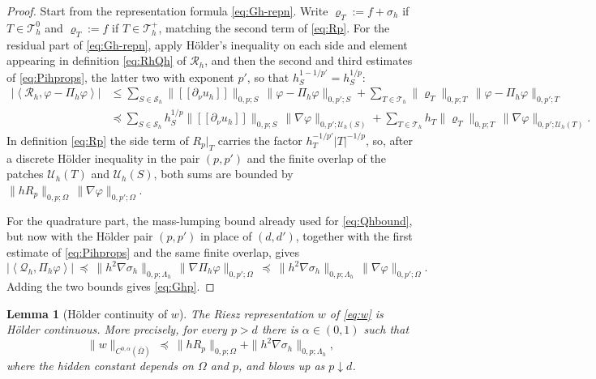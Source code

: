 \documentclass[12pt]{amsart}
\newtheorem{lemma}{Lemma}
\theoremstyle{definition}
\newcommand{\Om}{\Omega}
\newcommand{\Th}{\mathcal{T}_h}
\newcommand{\Sh}{\mathcal{S}_h}
\newcommand{\Pih}{\Pi_h}
\newcommand{\Uh}{\mathcal{U}_h}
\newcommand{\Thplus}{\Th^+}
\newcommand{\Thzero}{\Th^0}
\newcommand{\Rh}{\mathcal{R}_h}
\newcommand{\Qh}{\mathcal{Q}_h}
\newcommand{\jump}[1]{[\![#1]\!]}
\newcommand{\Lamh}{\Lambda_h}
\begin{document}
\begin{proof}
Start from the representation formula \eqref{eq:Gh-repn}.  Write $\varrho_T := f + \sigma_h$ if $T\in\Thzero$ and $\varrho_T := f$ if $T\in\Thplus$, matching the second term of \eqref{eq:Rp}.  For the residual part of \eqref{eq:Gh-repn}, apply H\"older's inequality on each side and element appearing in definition \eqref{eq:RhQh} of $\Rh$, and then the second and third estimates of \eqref{eq:Pihprops}, the latter two with exponent $p'$, so that $h_S^{1-1/p'} = h_S^{1/p}$:
\begin{align*}
  \bigl|\left<\Rh,\varphi-\Pih\varphi\right>\bigr|
  &\le \sum_{S\in\Sh} \bigl\|\jump{\partial_\nu u_h}\bigr\|_{0,p;S}\,\|\varphi-\Pih\varphi\|_{0,p';S}
     + \sum_{T\in\Th} \|\varrho_T\|_{0,p;T}\,\|\varphi-\Pih\varphi\|_{0,p';T} \\
  &\preceq \sum_{S\in\Sh} h_S^{1/p}\bigl\|\jump{\partial_\nu u_h}\bigr\|_{0,p;S}\,\|\nabla\varphi\|_{0,p';\Uh(S)}
     + \sum_{T\in\Th} h_T\|\varrho_T\|_{0,p;T}\,\|\nabla\varphi\|_{0,p';\Uh(T)}.
\end{align*}
In definition \eqref{eq:Rp} the side term of $R_p|_T$ carries the factor $h_T^{-1/p'}|T|^{-1/p}$, so, after a discrete H\"older inequality in the pair $(p,p')$ and the finite overlap of the patches $\Uh(T)$ and $\Uh(S)$, both sums are bounded by $\|hR_p\|_{0,p;\Om}\,\|\nabla\varphi\|_{0,p';\Om}$.

For the quadrature part, the mass-lumping bound already used for \eqref{eq:Qhbound}, but now with the H\"older pair $(p,p')$ in place of $(d,d')$, together with the first estimate of \eqref{eq:Pihprops} and the same finite overlap, gives
\[
  \bigl|\left<\Qh,\Pih\varphi\right>\bigr| \ \preceq\ \|h^2\nabla\sigma_h\|_{0,p;\Lamh}\,\|\nabla\Pih\varphi\|_{0,p';\Om}
  \ \preceq\ \|h^2\nabla\sigma_h\|_{0,p;\Lamh}\,\|\nabla\varphi\|_{0,p';\Om}.
\]
Adding the two bounds gives \eqref{eq:Ghp}.
\end{proof}

\begin{lemma}[H\"older continuity of $w$]
\label{lem:holder}
The Riesz representation $w$ of \eqref{eq:w} is H\"older continuous.  More precisely, for every $p > d$ there is $\alpha \in (0,1)$ such that
\begin{equation}
\label{eq:holder}
  \|w\|_{C^{0,\alpha}(\bar\Om)} \ \preceq\ \|h R_p\|_{0,p;\Om} + \|h^2\nabla\sigma_h\|_{0,p;\Lamh},
\end{equation}
where the hidden constant depends on $\Om$ and $p$, and blows up as $p \downarrow d$.
\end{lemma}
\end{document}
